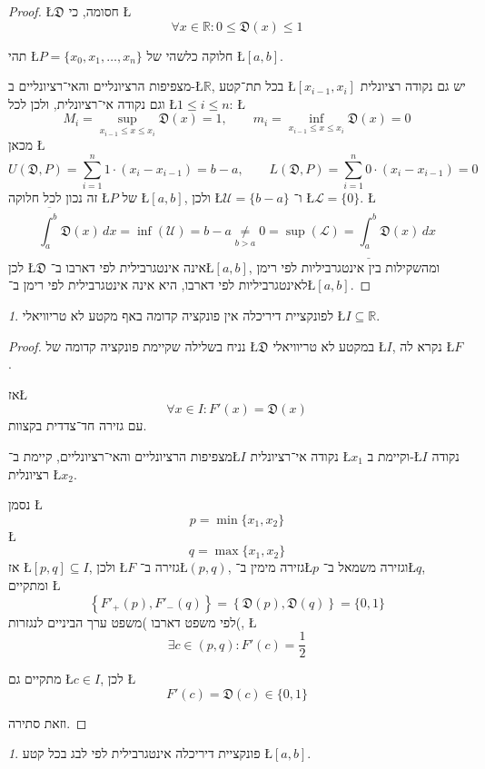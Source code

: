 \documentclass[english,hebrew]{article}
\theoremstyle{remark}
\theoremstyle{definition}
\theoremstyle{plain}
\theoremstyle{remark}
\newtheorem{claim}[thm]{\protect\claimname}
\theoremstyle{plain}
\theoremstyle{plain}
\theoremstyle{definition}
\theoremstyle{plain}
\providecommand{\claimname}{טענה}
\begin{document}
\begin{proof}
\L{$\mathfrak{D}$} חסומה, כי \L{%
\[
\forall x\in\mathbb{R}:0\le\mathfrak{D}(x)\le1
\]
}%

תהי \L{$P=\{x_{0},x_{1},\dots,x_{n}\}$} חלוקה כלשהי של \L{$[a,b]$}.

מצפיפות הרציונליים והאי־רציונליים ב-\L{$\mathbb{R}$}, בכל תת־קטע
\L{$[x_{i-1},x_{i}]$} יש גם נקודה רציונלית וגם נקודה אי־רציונלית,
ולכן לכל \L{$1\le i\le n$}: \L{%
\[
M_{i}=\sup_{x_{i-1}\le x\le x_{i}}\mathfrak{D}(x)=1,\qquad m_{i}=\inf_{x_{i-1}\le x\le x_{i}}\mathfrak{D}(x)=0
\]
}%
מכאן \L{%
\[
U(\mathfrak{D},P)=\sum_{i=1}^{n}1\cdot(x_{i}-x_{i-1})=b-a,\qquad L(\mathfrak{D},P)=\sum_{i=1}^{n}0\cdot(x_{i}-x_{i-1})=0
\]
}%
זה נכון לכל חלוקה \L{$P$} של \L{$[a,b]$}, ולכן \L{$\mathcal{U}=\{b-a\}$}
ו־ \L{$\mathcal{L}=\{0\}$}. \L{%
\[
\overline{\int_{a}^{b}}\mathfrak{D}(x)\,dx=\inf(\mathcal{U})=b-a\underset{b>a}{\neq}0=\sup(\mathcal{L})=\underline{\int_{a}^{b}}\mathfrak{D}(x)\,dx
\]
}%
לכן \L{$\mathfrak{D}$} אינה אינטגרבילית לפי דארבו ב־\L{$[a,b]$},
ומהשקילות בין אינטגרביליות לפי רימן לאינטגרביליות לפי דארבו, היא אינה
אינטגרבילית לפי רימן ב־\L{$[a,b]$}. 
\end{proof}
\begin{claim}
לפונקציית דיריכלה אין פונקציה קדומה באף מקטע לא טריוויאלי \L{$I\subseteq\mathbb{R}$}. 
\end{claim}

\begin{proof}
נניח בשלילה שקיימת פונקציה קדומה של \L{$\mathfrak{D}$} במקטע לא טריוויאלי
\L{$I$}, נקרא לה \L{$F$}.

אז\L{%
\[
\forall x\in I:F'(x)=\mathfrak{D}(x)
\]
}%
עם גזירה חד־צדדית בקצוות.

מצפיפות הרציונליים והאי־רציונליים, קיימת ב־\L{$I$} נקודה אי־רציונלית
\L{$x_{1}$} וקיימת ב-\L{$I$} נקודה רציונלית \L{$x_{2}$}.

נסמן \L{%
\[
p=\min\{x_{1},x_{2}\}
\]
}%
\L{%
\[
q=\max\{x_{1},x_{2}\}
\]
}%
אז \L{$[p,q]\subseteq I$}, ולכן \L{$F$} גזירה ב־\L{$(p,q)$}, גזירה
מימין ב־\L{$p$} וגזירה משמאל ב־\L{$q$}, ומתקיים \L{%
\[
\left\{ F'_{+}(p),F'_{-}(q)\right\} =\left\{ \mathfrak{D}(p),\mathfrak{D}(q)\right\} =\{0,1\}
\]
}%
לפי משפט דארבו )משפט ערך הביניים לנגזרות(, \L{%
\[
\exists c\in\left(p,q\right):F'(c)=\frac{1}{2}
\]
}%

מתקיים גם \L{$c\in I$}, לכן \L{%
\[
F'\left(c\right)=\mathfrak{D}(c)\in\{0,1\}
\]
}%

וזאת סתירה.
\end{proof}
\begin{claim}
פונקציית דיריכלה אינטגרבילית לפי לבג בכל קטע \L{$[a,b]$}.
\end{claim}
\end{document}
